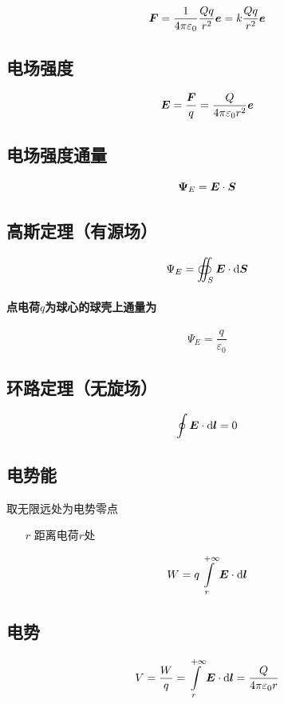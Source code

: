 \documentclass{article}
\begin{document}
\[\boldsymbol{F}=\frac1{4\pi\varepsilon_0}\frac{Qq}{r^2}\boldsymbol{e}=k\frac{Qq}{r^2}\boldsymbol{e}\]

\subsection{电场强度}

\[\boldsymbol{E}=\frac{\boldsymbol{F}}q=\frac Q{4\pi\varepsilon_0r^2}\boldsymbol{e}\]

\subsection{电场强度通量}

\[\boldsymbol{\Psi}_E=\boldsymbol{E}\cdot\boldsymbol{S}\]

\subsection{高斯定理（有源场）}

\[\Psi_E=\oiint_S\boldsymbol{E}\cdot\mathrm d\boldsymbol{S}\]

\paragraph{点电荷$q$为球心的球壳上通量为}

\[\Psi_E=\frac q{\varepsilon_0}\]

\subsection{环路定理（无旋场）}

\[\oint\boldsymbol{E}\cdot\mathrm d\boldsymbol{l}=0\]

\subsection{电势能}

取无限远处为电势零点

\begin{enumerate}
    \item[$r$] 距离电荷$r$处
\end{enumerate}

\[W=q\int\limits_r^{+\infty}\boldsymbol{E}\cdot\mathrm d\boldsymbol{l}\]

\subsection{电势}

\[V=\frac Wq=\int\limits_r^{+\infty}\boldsymbol{E}\cdot\mathrm d\boldsymbol{l}=\frac Q{4\pi\varepsilon_0r}\]
\end{document}
